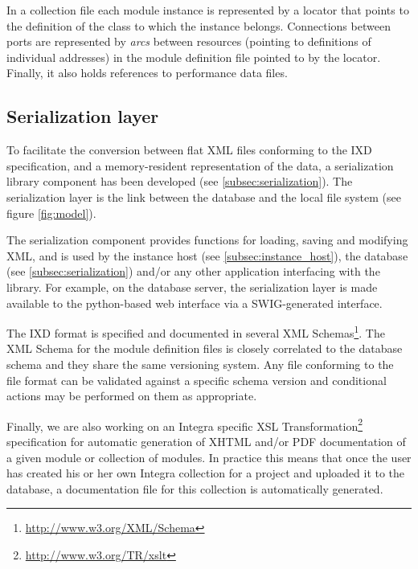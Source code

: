 {In a collection file each module instance is represented by a locator that points to the definition of the class to which the instance belongs. Connections between ports are represented by \emph{arcs} between resources (pointing to definitions of individual addresses) in the module definition file pointed to by the locator. Finally, it also holds references to performance data files.


\subsection{Serialization layer}\label{sec:serialization_layer}

To facilitate the conversion between flat XML files conforming to the IXD specification, and a memory-resident representation of the data, a serialization library component has been developed (see \ref{subsec:serialization}). The serialization layer is the link  between the database and the local file system (see figure \ref{fig:model}).

The serialization component provides functions for loading, saving and modifying XML, and is used by the instance host (see \ref{subsec:instance_host}), the database (see \ref{subsec:serialization}) and/or any other application interfacing with the library. For example, on the database server, the serialization layer is made available to the python-based web interface via a SWIG-generated interface.

The IXD format is specified and documented in several XML Schemas\footnote{\url{http://www.w3.org/XML/Schema}}. The XML Schema for the module definition files is closely correlated to the database schema and they share the same versioning system. Any file conforming to the file format can be validated against a specific schema version and conditional actions may be performed on them as appropriate.

Finally, we are also working on an Integra specific XSL Transformation\footnote{\url{http://www.w3.org/TR/xslt}} specification for automatic generation of XHTML and/or PDF documentation of a given module or collection of modules. In practice this means that once the user has created his or her own Integra collection for a project and uploaded it to the database, a documentation file for this collection is automatically generated.


}
